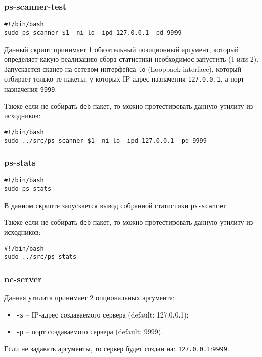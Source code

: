 \subsubsection{ps-scanner-test}

\begin{lstlisting}
#!/bin/bash
sudo ps-scanner-$1 -ni lo -ipd 127.0.0.1 -pd 9999
\end{lstlisting}
Данный скрипт принимает 1 обязательный позиционный аргумент, который определяет какую реализацию сбора статистики необходимос запустить (1 или 2). Запускается сканер на сетевом интерфейса \verb|lo| (Loopback interface), который отбирает только те пакеты, у которых IP-адрес назначения \verb|127.0.0.1|, а порт назначения \verb|9999|.

\linespace

Также если не собирать \verb|deb|-пакет, то можно протестировать данную утилиту из исходников:
\begin{lstlisting}
#!/bin/bash
sudo ../src/ps-scanner-$1 -ni lo -ipd 127.0.0.1 -pd 9999
\end{lstlisting}

\newpage

\subsubsection{ps-stats}

\begin{lstlisting}
#!/bin/bash
sudo ps-stats
\end{lstlisting}
В данном скрипте запускается вывод собранной статистики \verb|ps-scanner|.

\linespace

Также если не собирать \verb|deb|-пакет, то можно протестировать данную утилиту из исходников:
\begin{lstlisting}
#!/bin/bash
sudo ../src/ps-stats
\end{lstlisting}

\subsubsection{nc-server}

Данная утилита принимает 2 опциональных аргумента:
\begin{itemize}
    \item \verb|-s| -- IP-адрес создаваемого сервера \footnotesize(default: 127.0.0.1)\normalsize;
    \item \verb|-p| -- порт создаваемого сервера \footnotesize(default: 9999)\normalsize.
\end{itemize}
Если не задавать аргументы, то сервер будет создан на: \verb|127.0.0.1|:\verb|9999|.


